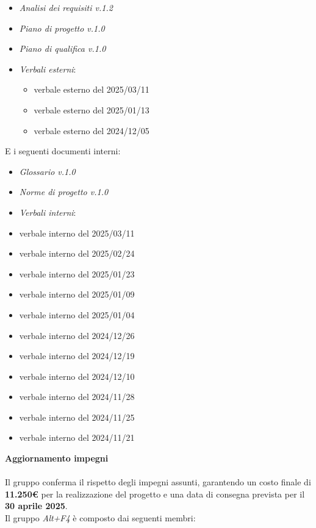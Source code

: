 \documentclass[a4paper, 12pt]{article}
\begin{document}
\begin{itemize}
    \item \textit{Analisi dei requisiti v.1.2}
    \item \textit{Piano di progetto v.1.0}
    \item \textit{Piano di qualifica v.1.0}
    \item \textit{Verbali esterni}:
    \begin{itemize}
        \item verbale esterno del 2025/03/11
        \item verbale esterno del 2025/01/13
        \item verbale esterno del 2024/12/05
    \end{itemize}
\end{itemize}
\noindent
E i seguenti documenti interni:
\begin{itemize}
    \item \textit{Glossario v.1.0}
    \item \textit{Norme di progetto v.1.0}
    \item \textit{Verbali interni}:
    \item verbale interno del 2025/03/11
    \item verbale interno del 2025/02/24
    \item verbale interno del 2025/01/23
    \item verbale interno del 2025/01/09
    \item verbale interno del 2025/01/04
    \item verbale interno del 2024/12/26
    \item verbale interno del 2024/12/19
    \item verbale interno del 2024/12/10
    \item verbale interno del 2024/11/28
    \item verbale interno del 2024/11/25
    \item verbale interno del 2024/11/21
\end{itemize}
\vspace{0.75cm} 
\noindent
\textbf{Aggiornamento impegni}\\
\\
Il gruppo conferma il rispetto degli impegni assunti, garantendo un costo finale di \textbf{11.250€} per la realizzazione del progetto e una data di consegna prevista per il \textbf{30 aprile 2025}.
\vspace{0.75cm} 
\\
\noindent
Il gruppo \textit{Alt+F4} è composto dai seguenti membri:
\end{document}
